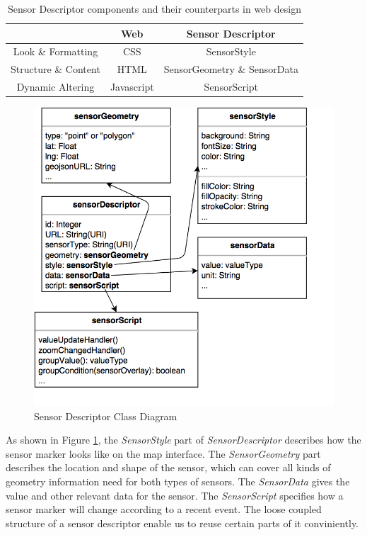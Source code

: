 \documentclass{article}
\begin{document}
\begin{table}[h]
\begin{center}
\begin{tabular}{c|cc}
 & Web & Sensor Descriptor \\ \hline
Look \& Formatting & CSS & SensorStyle \\ 
Structure \& Content & HTML & SensorGeometry \& SensorData\\
Dynamic Altering & Javascript & SensorScript \\
\end{tabular}
\end{center}
\caption{Sensor Descriptor components and their counterparts in web design}\label{table:sensordes}
\end{table}


\begin{figure}[htb]
\centering
\includegraphics[width=0.8\columnwidth]{SensorDescriptor.png}
\caption{Sensor Descriptor Class Diagram}\label{fig:sensordes}
\end{figure}

As shown in Figure \ref{fig:sensordes}, the \textit{SensorStyle} part of \textit{SensorDescriptor} describes how the sensor marker looks like on the map interface. The \textit{SensorGeometry} part describes the location and shape of the sensor, which can cover all kinds of geometry information need for both types of sensors. The \textit{SensorData} gives the value and other relevant data for the sensor. The \textit{SensorScript} specifies how a sensor marker will change according to a recent event. The loose coupled structure of a sensor descriptor enable us to reuse certain parts of it conviniently.
\end{document}
